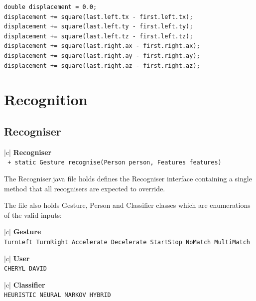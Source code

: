 \documentclass[12pt,a4,notitlepage]{report}
\renewcommand{\_}{\texttt{\symbol{95}}}
\newcommand{\<}{\texttt{\symbol{60}}}
\renewcommand{\>}{\texttt{\symbol{62}}}
\newcommand{\class}[1]{\textbf{#1}}
\newcommand{\variable}[1]{\texttt{#1}}
\begin{document}
\begin{verbatim}
double displacement = 0.0;
displacement += square(last.left.tx - first.left.tx);
displacement += square(last.left.ty - first.left.ty);
displacement += square(last.left.tz - first.left.tz);
displacement += square(last.right.ax - first.right.ax);
displacement += square(last.right.ay - first.right.ay);
displacement += square(last.right.az - first.right.az);
\end{verbatim}

\newpage

\section{Recognition}

\subsection{Recogniser}

\begin{tabular}{|c|} \hline 
\class{Recogniser} \\ \hline
{}
{\variable{
+ static Gesture recognise(Person person, Features features)
 } } \\
\hline
\end{tabular}

The Recogniser.java file holds defines the Recogniser interface containing a single method that all recognisers are expected to override.

The file also holds Gesture, Person and Classifier classes which are enumerations of the valid inputs:

\begin{tabular}[t]{|c|} \hline 
\class{Gesture} \\ \hline
{}
{\variable{TurnLeft \newline TurnRight \newline Accelerate \newline Decelerate \newline StartStop \newline NoMatch \newline MultiMatch
} } \\ \hline
\end{tabular}\hfill
\begin{tabular}[t]{|c|} \hline 
\class{User} \\ \hline
{}
{\variable{CHERYL \newline DAVID
} } \\ \hline
\end{tabular}\hfill
\begin{tabular}[t]{|c|} \hline 
\class{Classifier} \\ \hline
{}
{\variable{HEURISTIC \newline NEURAL \newline MARKOV \newline HYBRID
} } \\ \hline
\end{tabular}
\end{document}

